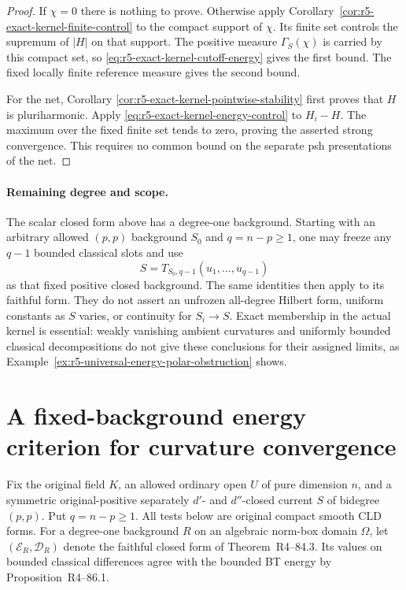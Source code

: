 \documentclass[11pt,a4paper]{article}
\numberwithin{equation}{section}
\theoremstyle{definition}
\theoremstyle{remark}
\begin{document}
\begin{proof}
If $\chi=0$ there is nothing to prove.  Otherwise apply
Corollary~\ref{cor:r5-exact-kernel-finite-control} to the
compact support of $\chi$.  Its finite set controls the
supremum of $|H|$ on that support.  The positive measure
$\Gamma_S(\chi)$ is carried by this compact set, so
\eqref{eq:r5-exact-kernel-cutoff-energy} gives the first
bound.  The fixed locally finite reference measure gives
the second bound.

For the net, Corollary
\ref{cor:r5-exact-kernel-pointwise-stability} first proves
that $H$ is pluriharmonic.  Apply
\eqref{eq:r5-exact-kernel-energy-control} to $H_i-H$.
The maximum over the fixed finite set tends to zero, proving
the asserted strong convergence.  This requires no common
bound on the separate psh presentations of the net.
\end{proof}

\paragraph{Remaining degree and scope.}
The scalar closed form above has a degree-one background.  Starting
with an arbitrary allowed $(p,p)$ background $S_0$ and
$q=n-p\geq1$, one may freeze any $q-1$ bounded classical slots
and use
\[
               S=T_{S_0,q-1}(u_1,\ldots,u_{q-1})
\]
as that fixed positive closed background.  The same identities
then apply to its faithful form.  They do not assert an
unfrozen all-degree Hilbert form, uniform constants as $S$
varies, or continuity for $S_i\to S$.  Exact membership in
the actual kernel is essential: weakly vanishing ambient
curvatures and uniformly bounded classical decompositions do
not give these conclusions for their assigned limits, as
Example~\ref{ex:r5-universal-energy-polar-obstruction} shows.



\section{A fixed-background energy criterion for curvature convergence}
\label{sec:r5-relative-energy-convergence}

Fix the original field $K$, an allowed ordinary open $U$ of
pure dimension $n$, and a symmetric original-positive separately
$d'$- and $d''$-closed current $S$ of bidegree $(p,p)$.
Put $q=n-p\geq1$. All tests below are original compact smooth
CLD forms. For a degree-one background $R$ on an algebraic
norm-box domain $\Omega$, let $(\mathcal E_R,\mathscr D_R)$
denote the faithful closed form of
Theorem~\textup{R4--84.3}. Its values on
bounded classical differences agree with the bounded BT energy
by Proposition~\textup{R4--86.1}.
\end{document}
